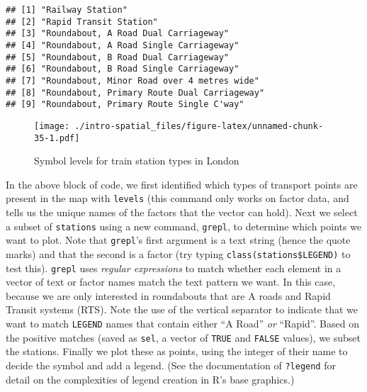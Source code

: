 \documentclass[]{article}
\newenvironment{Shaded}{}{}
\newcommand{\KeywordTok}[1]{\textcolor[rgb]{0.00,0.44,0.13}{\textbf{{#1}}}}
\newcommand{\DataTypeTok}[1]{\textcolor[rgb]{0.56,0.13,0.00}{{#1}}}
\newcommand{\StringTok}[1]{\textcolor[rgb]{0.25,0.44,0.63}{{#1}}}
\newcommand{\CommentTok}[1]{\textcolor[rgb]{0.38,0.63,0.69}{\textit{{#1}}}}
\newcommand{\NormalTok}[1]{{#1}}
\begin{document}
\begin{Shaded}
\end{Shaded}

\begin{verbatim}
## [1] "Railway Station"                           
## [2] "Rapid Transit Station"                     
## [3] "Roundabout, A Road Dual Carriageway"       
## [4] "Roundabout, A Road Single Carriageway"     
## [5] "Roundabout, B Road Dual Carriageway"       
## [6] "Roundabout, B Road Single Carriageway"     
## [7] "Roundabout, Minor Road over 4 metres wide" 
## [8] "Roundabout, Primary Route Dual Carriageway"
## [9] "Roundabout, Primary Route Single C'way"
\end{verbatim}

\begin{figure}[htbp]
\centering
\texttt{[image: ./intro-spatial\_files/figure-latex/unnamed-chunk-35-1.pdf]}
\caption{Symbol levels for train station types in London}
\end{figure}

In the above block of code, we first identified which types of transport
points are present in the map with \texttt{levels} (this command only
works on factor data, and tells us the unique names of the factors that
the vector can hold). Next we select a subset of \texttt{stations} using
a new command, \texttt{grepl}, to determine which points we want to
plot. Note that \texttt{grepl}'s first argument is a text string (hence
the quote marks) and that the second is a factor (try typing
\texttt{class(stations\$LEGEND)} to test this). \texttt{grepl} uses
\emph{regular expressions} to match whether each element in a vector of
text or factor names match the text pattern we want. In this case,
because we are only interested in roundabouts that are A roads and Rapid
Transit systems (RTS). Note the use of the vertical separator
\texttt{\textbar{}} to indicate that we want to match \texttt{LEGEND}
names that contain either ``A Road'' \emph{or} ``Rapid''. Based on the
positive matches (saved as \texttt{sel}, a vector of \texttt{TRUE} and
\texttt{FALSE} values), we subset the stations. Finally we plot these as
points, using the integer of their name to decide the symbol and add a
legend. (See the documentation of \texttt{?legend} for detail on the
complexities of legend creation in R's base graphics.)
\end{document}
